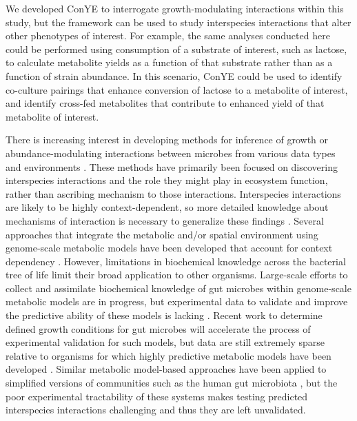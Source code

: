 \documentclass[11pt,onecolumn,notitlepage,openany,twoside]{book}
\begin{document}
\begin{refsection}
We developed ConYE to interrogate growth-modulating interactions within this study, but the framework can be used to study interspecies interactions that alter other phenotypes of interest. For example, the same analyses conducted here could be performed using consumption of a substrate of interest, such as lactose, to calculate metabolite yields as a function of that substrate rather than as a function of strain abundance. In this scenario, ConYE could be used to identify co-culture pairings that enhance conversion of lactose to a metabolite of interest, and identify cross-fed metabolites that contribute to enhanced yield of that metabolite of interest.

There is increasing interest in developing methods for inference of growth or abundance-modulating interactions between microbes from various data types and environments \cite{Friedman2017-zn,Weiss2016-tq,Xiao2017-yl}. These methods have primarily been focused on discovering interspecies interactions and the role they might play in ecosystem function, rather than ascribing mechanism to those interactions. Interspecies interactions are likely to be highly context-dependent, so more detailed knowledge about mechanisms of interaction is necessary to generalize these findings \cite{Chamberlain2014-nt}. Several approaches that integrate the metabolic and/or spatial environment using genome-scale metabolic models have been developed that account for context dependency \cite{Chan2017-tk,Harcombe2014-ev,Zomorrodi2012-ja}. However, limitations in biochemical knowledge across the bacterial tree of life limit their broad application to other organisms. Large-scale efforts to collect and assimilate biochemical knowledge of gut microbes within genome-scale metabolic models are in progress, but experimental data to validate and improve the predictive ability of these models is lacking \cite{Magnusdottir2017-dk}. Recent work to determine defined growth conditions for gut microbes will accelerate the process of experimental validation for such models, but data are still extremely sparse relative to organisms for which highly predictive metabolic models have been developed \cite{Tramontano2018-xz}. Similar metabolic model-based approaches have been applied to simplified versions of communities such as the human gut microbiota \cite{Bauer2017-kf,Chan2017-tk}, but the poor experimental tractability of these systems makes testing predicted interspecies interactions challenging and thus they are left unvalidated.


\end{refsection}
\end{document}
